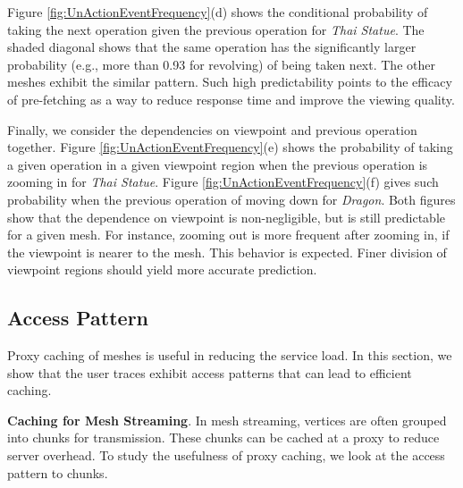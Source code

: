 Figure \ref{fig:UnActionEventFrequency}(d) shows the conditional 
probability of taking the next operation given the previous operation 
for \textit{Thai Statue}.
The shaded diagonal shows that the same operation has the significantly larger probability (e.g., more than 0.93 for revolving) of being taken next.
The other meshes exhibit the similar pattern. 
Such high predictability points to the efficacy of pre-fetching as a
way to reduce response time and improve the viewing quality. 


Finally, we consider the dependencies on viewpoint and previous
operation together.  
Figure \ref{fig:UnActionEventFrequency}(e) shows the
probability of taking a given operation in a given viewpoint region
when the previous operation is zooming in for \textit{Thai
Statue}.  Figure \ref{fig:UnActionEventFrequency}(f) gives such probability when the previous operation of moving down for \textit{Dragon}. Both
figures show that the dependence on viewpoint is non-negligible, but 
is still predictable for a given mesh.  For instance, zooming out is more frequent after zooming in, if the viewpoint is nearer to the mesh.  This behavior is expected.  Finer division of viewpoint regions should yield more accurate prediction.

\subsection{Access Pattern}
Proxy caching of meshes is useful in reducing the service load.  
In this section, we show that the user traces exhibit access
patterns that can lead to efficient caching.

\textbf{Caching for Mesh Streaming}.
In mesh streaming, vertices are often grouped into chunks \cite{cheng08receiver}
for transmission. These chunks can be cached at a proxy to reduce server overhead.
To study the usefulness of proxy caching, we look at the access pattern to chunks. 


